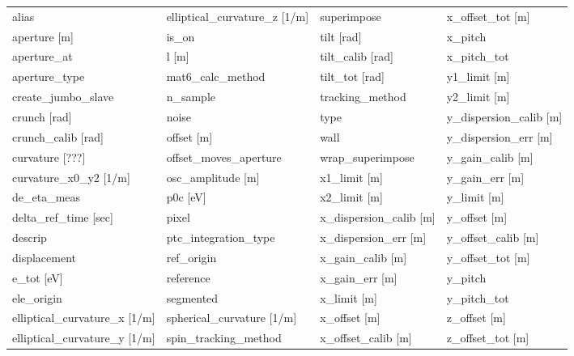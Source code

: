  \begin{tabular}{llll} \toprule
alias                            & elliptical_curvature_z [1/m]     & superimpose                      & x_offset_tot [m]                 \\
aperture [m]                     & is_on                            & tilt [rad]                       & x_pitch                          \\
aperture_at                      & l [m]                            & tilt_calib [rad]                 & x_pitch_tot                      \\
aperture_type                    & mat6_calc_method                 & tilt_tot [rad]                   & y1_limit [m]                     \\
create_jumbo_slave               & n_sample                         & tracking_method                  & y2_limit [m]                     \\
crunch [rad]                     & noise                            & type                             & y_dispersion_calib [m]           \\
crunch_calib [rad]               & offset [m]                       & wall                             & y_dispersion_err [m]             \\
curvature [???]                  & offset_moves_aperture            & wrap_superimpose                 & y_gain_calib [m]                 \\
curvature_x0_y2 [1/m]            & osc_amplitude [m]                & x1_limit [m]                     & y_gain_err [m]                   \\
de_eta_meas                      & p0c [eV]                         & x2_limit [m]                     & y_limit [m]                      \\
delta_ref_time [sec]             & pixel                            & x_dispersion_calib [m]           & y_offset [m]                     \\
descrip                          & ptc_integration_type             & x_dispersion_err [m]             & y_offset_calib [m]               \\
displacement                     & ref_origin                       & x_gain_calib [m]                 & y_offset_tot [m]                 \\
e_tot [eV]                       & reference                        & x_gain_err [m]                   & y_pitch                          \\
ele_origin                       & segmented                        & x_limit [m]                      & y_pitch_tot                      \\
elliptical_curvature_x [1/m]     & spherical_curvature [1/m]        & x_offset [m]                     & z_offset [m]                     \\
elliptical_curvature_y [1/m]     & spin_tracking_method             & x_offset_calib [m]               & z_offset_tot [m]                 \\
 \bottomrule
 \end{tabular}
 \vfill
 
